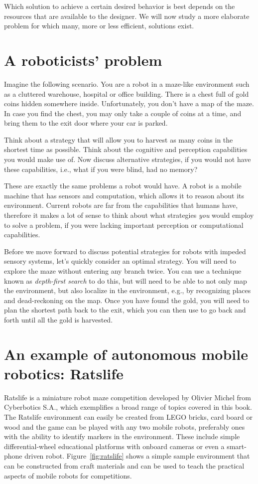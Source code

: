 Which solution to achieve a certain desired behavior is best depends on the resources that are available to the designer. We will now study a more elaborate problem for which many, more or less efficient, solutions exist.

\section{A roboticists' problem}
Imagine the following scenario. You are a robot in a maze-like environment such as a cluttered warehouse, hospital or office building. There is a chest full of gold coins hidden somewhere inside. Unfortunately, you don't have a map of the maze. In case you find the chest, you may only take a couple of coins at a time, and bring them to the exit door where your car is parked.

\begin{mdframed}
Think about a strategy that will allow you to harvest as many coins in the shortest time as possible. Think about the cognitive and perception capabilities you would make use of. Now discuss alternative strategies, if you would not have these capabilities, i.e., what if you were blind, had no memory?
\end{mdframed}

These are exactly the same problems a robot would have. A robot is a mobile machine that has sensors and computation, which allows it to reason about its environment. Current robots are far from the capabilities that humans have, therefore it makes a lot of sense to think about what strategies \emph{you} would employ to solve a problem, if you were lacking important perception or computational capabilities.

Before we move forward to discuss potential strategies for robots with impeded sensory systems, let's quickly consider an optimal strategy. You will need to explore the maze without entering any branch twice. You can use a technique known as \emph{depth-first search} to do this, but will need to be able to not only map the environment, but also localize in the environment, e.g., by recognizing places and dead-reckoning on the map. Once you have found the gold, you will need to plan the shortest path back to the exit, which you can then use to go back and forth until all the gold is harvested.

\section{An example of autonomous mobile robotics: Ratslife}\label{sec:ratslife}
Ratslife is a miniature robot maze competition developed by Olivier Michel from Cyberbotics S.A., which exemplifies a broad range of topics covered in this book. The Ratslife environment can easily be created from LEGO bricks, card board or wood and the game can be played with any two mobile robots, preferably ones with the ability to identify markers in the environment. These include simple differential-wheel educational platforms with onboard cameras or even a smart-phone driven robot. Figure~\ref{fig:ratslife} shows a simple sample environment that can be constructed from craft materials and can be used to teach the practical aspects of mobile robots for competitions.


